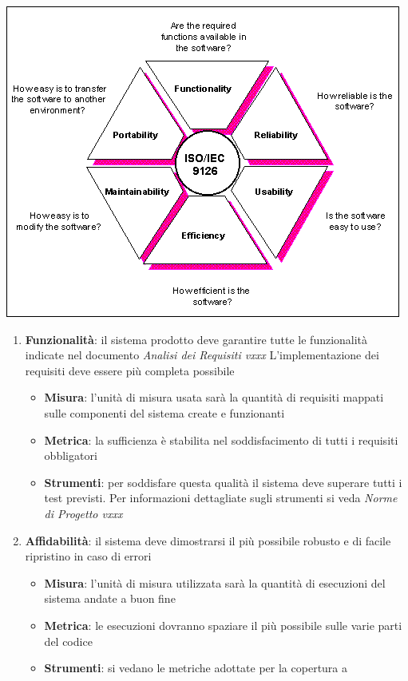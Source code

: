 {  \begin{center}
   \includegraphics[scale=0.5]{img/9126s.png}
\end{center}




\begin{enumerate}
  \item \textbf{Funzionalità}: il sistema prodotto deve garantire tutte
  le funzionalità indicate nel documento \emph{Analisi dei Requisiti
  vxxx} L'implementazione dei requisiti deve essere più completa
  possibile
  
  \begin{itemize}
    \item \textbf{Misura}: l’unità di misura usata sarà la quantità di requisiti mappati sulle componenti del sistema create e funzionanti
    \item \textbf{Metrica}: la sufficienza è stabilita nel soddisfacimento di tutti i requisiti obbligatori
    \item \textbf{Strumenti}: per soddisfare questa qualità il sistema deve superare tutti i test previsti.
    Per informazioni dettagliate sugli strumenti si veda  \emph{Norme di Progetto vxxx} 
  \end{itemize}
  
  \item \textbf{Affidabilità}: il sistema deve dimostrarsi il più possibile robusto e di facile ripristino in caso di errori
  
  \begin{itemize}
    \item \textbf{Misura}: l’unità di misura utilizzata sarà la quantità di esecuzioni del sistema andate a buon fine
    \item \textbf{Metrica}: le esecuzioni dovranno spaziare il più
    possibile sulle varie parti del codice
    \item \textbf{Strumenti}: si vedano le metriche adottate per la
    copertura a %
  \end{itemize}
  

\end{enumerate}}

